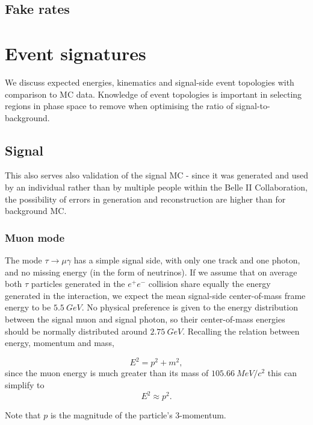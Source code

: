 \documentclass[12pt]{thesis}  %
\begin{document}
\section{Fake rates}


\pagebreak


\chapter{Event signatures}

We discuss expected energies, kinematics and signal-side event topologies with comparison to MC data. Knowledge of event topologies is important in selecting regions in phase space to remove when optimising the ratio of signal-to-background. 

\section{Signal}

This also serves also validation of the signal MC - since it was generated and used by an individual rather than by multiple people within the Belle II Collaboration, the possibility of errors in generation and reconstruction are higher than for background MC. 


\subsection{Muon mode}

The mode $\tau\to\mu\gamma$ has a simple signal side, with only one track and one photon, and no missing energy (in the form of neutrinos). If we assume that on average both $\tau$ particles generated in the $e^+ e^-$ collision share equally the energy generated in the interaction, we expect the mean signal-side center-of-mass frame energy to be $\SI{5.5}{GeV}$. No physical preference is given to the energy distribution between the signal muon and signal photon, so their center-of-mass energies should be normally distributed around $\SI{2.75}{GeV}$. Recalling the relation between energy, momentum and mass,

\begin{equation}
E^2 = p^2 + m^2,
\end{equation}
since the muon energy is much greater than its mass of $\SI{105.66}{MeV/c^2}$ this can simplify to
\begin{equation}
E^2 \approx p^2.
\end{equation}

Note that $p$ is the magnitude of the particle's 3-momentum.
\end{document}
